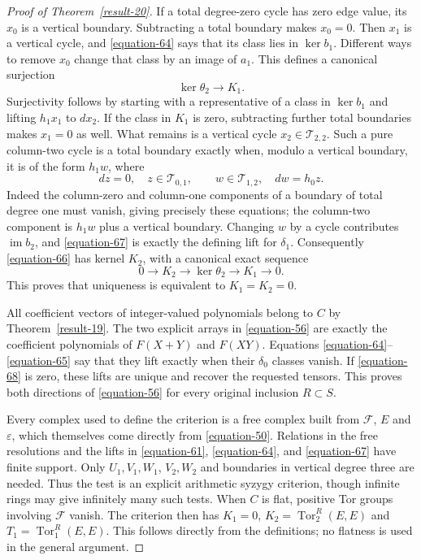 \documentclass[11pt,a4paper]{article}
\theoremstyle{definition}
\begin{document}
\begin{proof}[Proof of Theorem~\ref{result-20}]
If a total degree-zero cycle has zero edge value, its $x_0$ is a
vertical boundary. Subtracting a total boundary makes $x_0=0$.
Then $x_1$ is a vertical cycle, and \eqref{equation-64} says that its class
lies in $\ker b_1$. Different ways to remove $x_0$ change that
class by an image of $a_1$. This defines a canonical surjection
\begin{equation}
                       \ker\theta_2\longrightarrow K_1. \label{equation-66}
\end{equation}
Surjectivity follows by starting with a representative of a class
in $\ker b_1$ and lifting $h_1x_1$ to $dx_2$.
If the class in $K_1$ is zero, subtracting further total boundaries
makes $x_1=0$ as well. What remains is a vertical cycle
$x_2\in\mathcal T_{2,2}$. Such a pure column-two cycle is a total
boundary exactly when, modulo a vertical boundary, it is of the form
$h_1w$, where
\begin{equation}
 dz=0,\quad z\in\mathcal T_{0,1},\qquad
 w\in\mathcal T_{1,2},\quad dw=h_0z.                     \label{equation-67}
\end{equation}
Indeed the column-zero and column-one components of a boundary
of total degree one must vanish, giving precisely these equations;
the column-two component is $h_1w$ plus a vertical boundary.
Changing $w$ by a cycle contributes $\operatorname{im}b_2$,
and \eqref{equation-67} is exactly the defining lift for $\delta_1$.
Consequently \eqref{equation-66} has kernel $K_2$, with a canonical exact
sequence
\begin{equation}
             0\longrightarrow K_2\longrightarrow\ker\theta_2
                     \longrightarrow K_1\longrightarrow0.   \label{equation-68}
\end{equation}
This proves that uniqueness is equivalent to $K_1=K_2=0$.

All coefficient vectors of integer-valued polynomials belong to
$C$ by Theorem~\ref{result-19}. The two explicit arrays in \eqref{equation-56} are exactly the
coefficient polynomials of $F(X+Y)$ and $F(XY)$.
Equations \eqref{equation-64}--\eqref{equation-65} say that they lift exactly when their
$\delta_0$ classes vanish. If \eqref{equation-68} is zero, these lifts are
unique and recover the requested tensors. This proves both
directions of \eqref{equation-56} for every original inclusion $R\subset S$.

Every complex used to define the criterion is a free complex built
from $\mathcal F$, $E$ and $\varepsilon$, which themselves come
directly from \eqref{equation-50}. Relations in the free resolutions and the
lifts in \eqref{equation-61}, \eqref{equation-64}, and \eqref{equation-67} have finite support.
Only $U_1,V_1,W_1$, $V_2,W_2$ and boundaries in vertical degree
three are needed. Thus the test is an explicit arithmetic syzygy
criterion, though infinite rings may give infinitely many such
tests. When $C$ is flat, positive Tor groups involving $\mathcal F$ vanish.
The criterion then has $K_1=0$, $K_2=\operatorname{Tor}_2^R(E,E)$ and
$T_1=\operatorname{Tor}_1^R(E,E)$.  This follows directly from the
definitions; no flatness is used in the general argument.


\end{proof}
\end{document}
